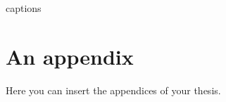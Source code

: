 \documentclass[
  digital, %
  table,   %
  lof,     %
  lot,     %
]{fithesis3}
\begin{document}
  
  
{\csname captions\languagename\endcsname %
\makeatletter %
  \thesis@selectLocale{\thesis@locale}\makeatother
\printbibliography[heading=bibintoc]} %
\appendix %
\chapter{An appendix}
Here you can insert the appendices of your thesis.   
\end{document}
